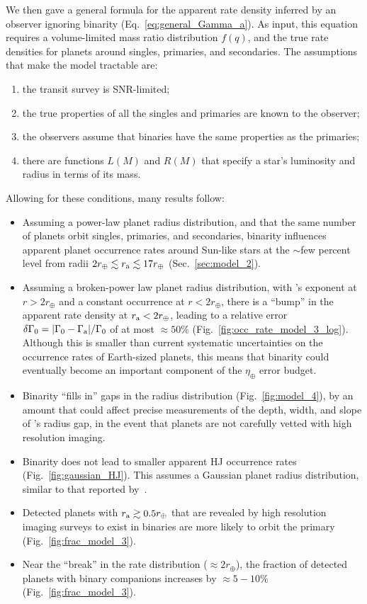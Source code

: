 \documentclass[12pt,modern]{aastex61}
\renewcommand{\a}{_{\rm a}}
\begin{document}
We then gave a general formula for the apparent rate density inferred by an 
observer ignoring binarity (Eq.~\ref{eq:general_Gamma_a}).
As input, this equation requires a volume-limited mass ratio distribution 
$f(q)$, and the true rate densities for planets around singles, 
primaries, and secondaries.
The assumptions that make the model tractable are:
\begin{enumerate}
    \item the transit survey is SNR-limited;
    \item the true properties of all the singles and primaries are known to 
    the observer;
    \item the observers assume that binaries have the same properties as the 
    primaries;
    \item there are functions $L(M)$ and $R(M)$ that specify a star's 
    luminosity and radius in terms of its mass.
\end{enumerate}
Allowing for these conditions, many results follow:
\begin{itemize}
%
\item Assuming a power-law planet radius distribution, and that the same 
number of planets orbit singles, primaries, and secondaries, binarity 
influences apparent planet occurrence rates around Sun-like stars at the 
$\sim$few percent level from radii $2r_\oplus \lesssim r\a \lesssim 
17r_\oplus$ (Sec.~\ref{sec:model_2}).
%
\item Assuming a broken-power law planet radius distribution, with 
\citet{howard_planet_2012}'s exponent at $r > 2r_\oplus$ and a constant 
occurrence at $r < 2r_\oplus$, there is a ``bump'' in the apparent rate 
density at $r\a < 2r_\oplus$, leading to a relative error $\delta \Gamma_0 = 
|\Gamma_0 - \Gamma\a|/\Gamma_0$ of at most $\approx 50\%$ 
(Fig.~\ref{fig:occ_rate_model_3_log}).
Although this is smaller than current systematic uncertainties on the 
occurrence rates of Earth-sized planets, this means that binarity could
eventually become an important component of the $\eta_\oplus$ error budget.
%
\item Binarity ``fills in'' gaps in the radius distribution 
(Fig.~\ref{fig:model_4}), by an amount that could affect precise measurements 
of the depth, width, and slope of \citet{fulton_california-_2017}'s radius 
gap, in the event that planets are not carefully vetted with high resolution 
imaging.
%
\item Binarity does not lead to smaller apparent HJ occurrence rates 
(Fig.~\ref{fig:gaussian_HJ}).
This assumes a Gaussian planet radius distribution, similar to that reported 
by~\citet{petigura_CKS_2017}.
%
\item Detected planets with $r\a \gtrsim 0.5r_\oplus$ that are revealed by 
high resolution imaging surveys to exist in binaries are more likely to orbit 
the primary (Fig.~\ref{fig:frac_model_3}).
%
\item Near the ``break'' in the rate distribution ($\approx 2r_\oplus$), 
the fraction of detected planets with binary companions increases by 
$\approx 5-10\%$ (Fig.~\ref{fig:frac_model_3}).
\end{itemize}
\end{document}
